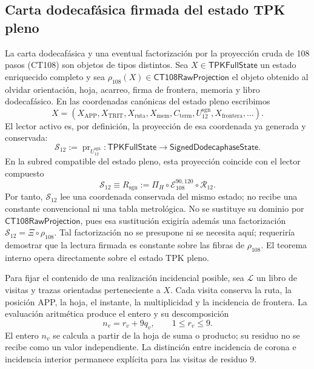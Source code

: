 \subsection{Carta dodecafásica firmada del estado TPK pleno}
\label{subsec:registro-evaluacion-incidencial}

La carta dodecafásica y una eventual factorización por la proyección cruda de
108 pasos (CT108) son objetos de tipos distintos. Sea
\(X\in\mathsf{TPKFullState}\) un estado enriquecido completo y sea
\(\rho_{108}(X)\in\mathsf{CT108RawProjection}\) el objeto obtenido al olvidar
orientación, hoja, acarreo, firma de frontera, memoria y libro dodecafásico.
En las coordenadas canónicas del estado pleno escribimos
\[
 X=(X_{\mathrm{APP}},X_{\mathrm{TRIT}},X_{\mathrm{ruta}},X_{\mathrm{mem}},
       C_{\mathrm{term}},U_{12}^{\mathrm{sgn}},
       X_{\mathrm{frontera}},\ldots).
\]
El lector activo es, por definición, la proyección de esa coordenada ya
generada y conservada:
\[
 \mathcal S_{12}:=\operatorname{pr}_{U_{12}^{\mathrm{sgn}}}:
 \mathsf{TPKFullState}\longrightarrow\mathsf{SignedDodecaphaseState}.
\]
En la subred compatible del estado pleno, esta proyección coincide con el
lector compuesto
\begin{equation}
 \mathcal S_{12}\equiv R_{\mathrm{sgn}}
 :=\Pi_H\circ\mathcal E_{108}^{90,120}\circ\mathcal R_{12}.
 \label{eq:registro-identidad-s12-rsgn}
\end{equation}
Por tanto, \(\mathcal S_{12}\) lee una coordenada conservada del mismo estado;
no recibe una constante
convencional ni una tabla metrológica. No se sustituye su dominio por
\(\mathsf{CT108RawProjection}\), pues esa sustitución exigiría además una
factorización \(\mathcal S_{12}=\Xi\circ\rho_{108}\). Tal factorización no se
presupone ni se necesita aquí; requeriría demostrar que la lectura firmada es
constante sobre las fibras de \(\rho_{108}\). El teorema interno opera
directamente sobre el estado TPK pleno.

Para fijar el contenido de una realización incidencial posible, sea
\(\mathscr L\) un libro de visitas y trazas orientadas perteneciente a
\(X\). Cada visita conserva la ruta, la posición APP, la hoja, el
instante, la multiplicidad y la incidencia de frontera. La evaluación
aritmética produce el entero y su descomposición
\[
 n_v=r_v+9q_v,\qquad 1\leq r_v\leq9.
\]
El entero \(n_v\) se calcula a partir de la hoja de suma o producto; su
residuo no se recibe como un valor independiente. La distinción entre
incidencia de corona e incidencia interior permanece explícita para las
visitas de residuo \(9\).

